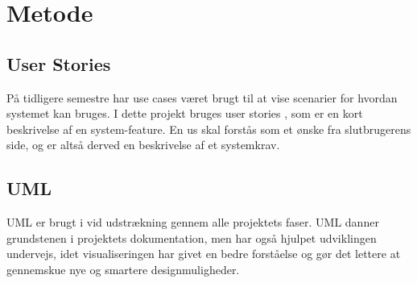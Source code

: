 \chapter{Metode}

\section{User Stories}
På tidligere semestre har use cases været brugt til at vise scenarier for hvordan systemet kan bruges. I dette projekt bruges user stories \cite{margaretrouse2015}, som er en kort beskrivelse af en system-feature. En \gls{us} skal forstås som et ønske fra slutbrugerens side, og er altså derved en beskrivelse af et systemkrav.

\section{UML}
UML er brugt i vid udstrækning gennem alle projektets faser. UML danner grundstenen i projektets dokumentation, men har også hjulpet udviklingen undervejs, idet visualiseringen har givet en bedre forståelse og gør det lettere at gennemskue nye og smartere designmuligheder.